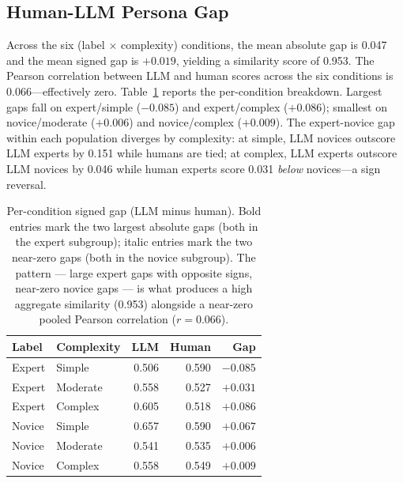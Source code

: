 \documentclass[manuscript,review]{acmart}
\begin{document}
\subsection{Human-LLM Persona Gap}
Across the six (label $\times$ complexity) conditions, the mean absolute gap is 0.047 and the mean signed gap is $+0.019$, yielding a similarity score of 0.953. The Pearson correlation between LLM and human scores across the six conditions is 0.066---effectively zero. Table~\ref{tab:gap} reports the per-condition breakdown. Largest gaps fall on expert/simple ($-0.085$) and expert/complex ($+0.086$); smallest on novice/moderate ($+0.006$) and novice/complex ($+0.009$). The expert-novice gap within each population diverges by complexity: at simple, LLM novices outscore LLM experts by 0.151 while humans are tied; at complex, LLM experts outscore LLM novices by 0.046 while human experts score 0.031 \emph{below} novices---a sign reversal.

\begin{table}[h]
  \caption{Per-condition signed gap (LLM minus human). Bold entries mark the two largest absolute gaps (both in the expert subgroup); italic entries mark the two near-zero gaps (both in the novice subgroup). The pattern --- large expert gaps with opposite signs, near-zero novice gaps --- is what produces a high aggregate similarity (0.953) alongside a near-zero pooled Pearson correlation ($r = 0.066$).}
  \label{tab:gap}
  \centering
  \begin{tabular}{l l r r r}
    \toprule
    \textbf{Label} & \textbf{Complexity} & \textbf{LLM} & \textbf{Human} & \textbf{Gap} \\
    \midrule
    Expert & Simple   & 0.506 & 0.590 & \textbf{$-0.085$} \\
    Expert & Moderate & 0.558 & 0.527 & $+0.031$ \\
    Expert & Complex  & 0.605 & 0.518 & \textbf{$+0.086$} \\
    Novice & Simple   & 0.657 & 0.590 & $+0.067$ \\
    Novice & Moderate & 0.541 & 0.535 & \emph{$+0.006$} \\
    Novice & Complex  & 0.558 & 0.549 & \emph{$+0.009$} \\
    \bottomrule
  \end{tabular}
\end{table}
\end{document}
